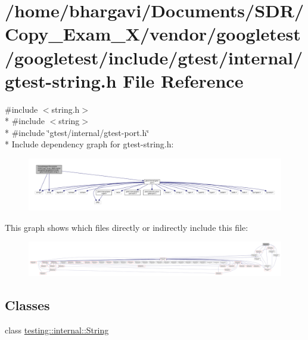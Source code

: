 \hypertarget{gtest-string_8h}{}\section{/home/bhargavi/\+Documents/\+S\+D\+R/\+Copy\+\_\+\+Exam\+\_\+X/vendor/googletest/googletest/include/gtest/internal/gtest-\/string.h File Reference}
\label{gtest-string_8h}
{\ttfamily \#include $<$string.\+h$>$}\\*
{\ttfamily \#include $<$string$>$}\\*
{\ttfamily \#include \char`\"{}gtest/internal/gtest-\/port.\+h\char`\"{}}\\*
Include dependency graph for gtest-\/string.h\+:
\nopagebreak
\begin{figure}[H]
\begin{center}
\leavevmode
\includegraphics[width=350pt]{gtest-string_8h__incl}
\end{center}
\end{figure}
This graph shows which files directly or indirectly include this file\+:
\nopagebreak
\begin{figure}[H]
\begin{center}
\leavevmode
\includegraphics[width=350pt]{gtest-string_8h__dep__incl}
\end{center}
\end{figure}
\subsection*{Classes}
\begin{DoxyCompactItemize}
\item 
class \hyperlink{classtesting_1_1internal_1_1_string}{testing\+::internal\+::\+String}
\end{DoxyCompactItemize}
